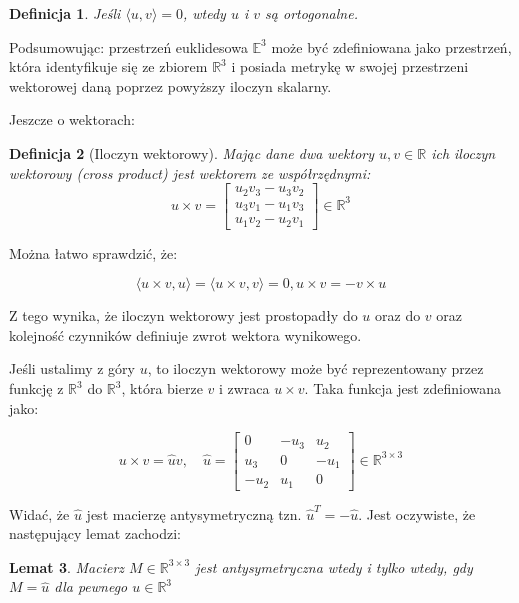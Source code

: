 \documentclass[a4paper,12pt]{article}
\newtheorem{defi}{Definicja}
\newtheorem{lemma}[defi]{Lemat}
\newcommand{\E}{\mathbb{E}}
\newcommand{\R}{\mathbb{R}}
\newcommand{\RR}{\mathbb{R}^3}
\newcommand{\RRR}{\mathbb{R}^{3 \times 3}}
\newcommand{\vecs}[2]{\langle #1 , #2 \rangle}
\begin{document}
\begin{defi}
Jeśli $\vecs{u}{v}=0$, wtedy $u$ i $v$ są ortogonalne.
\end{defi}

Podsumowując: przestrzeń euklidesowa $\E^3$ może być zdefiniowana jako przestrzeń, która identyfikuje się ze zbiorem $\RR$ i posiada metrykę w swojej przestrzeni wektorowej daną poprzez powyższy iloczyn skalarny.

Jeszcze o wektorach: 

\begin{defi}[Iloczyn wektorowy]
Mając dane dwa wektory $u,v \in \R$ ich iloczyn wektorowy (cross product) jest wektorem ze współrzędnymi:
\begin{equation}
  u \times v = 
  \begin{bmatrix}
    u_2v_3 - u_3v_2 \\ u_3v_1 - u_1v_3 \\ u_1v_2 - u_2v_1
  \end{bmatrix}
  \in \RR
\end{equation}
\end{defi}

\noindent Można łatwo sprawdzić, że:

\begin{equation}
\vecs{u \times v}{u} = \vecs{u \times v}{v} = 0, u \times v = -v \times u
\end{equation}

Z tego wynika, że iloczyn wektorowy jest prostopadły do $u$ oraz do $v$ oraz kolejność czynników definiuje zwrot wektora wynikowego. 

Jeśli ustalimy z góry $u$, to iloczyn wektorowy może być reprezentowany przez funkcję z $\RR$ do $\RR$, która bierze $v$ i zwraca $u \times v$. Taka funkcja jest zdefiniowana jako:

\begin{equation}
u \times v = \hat{u}v, \quad \hat{u} = 
\begin{bmatrix}
  0    & -u_3 & u_2  \\
  u_3  & 0    & -u_1 \\
  -u_2 & u_1  & 0
\end{bmatrix}
\in \RRR
\end{equation}

Widać, że $\hat{u}$ jest macierzę antysymetryczną tzn. $\hat{u}^T = -\hat{u}$. Jest oczywiste, że następujący lemat zachodzi:

\begin{lemma}
Macierz $M \in \RRR$ jest antysymetryczna wtedy i tylko wtedy, gdy $M=\hat{u}$ dla pewnego $u \in \RR$
\end{lemma}
\end{document}
